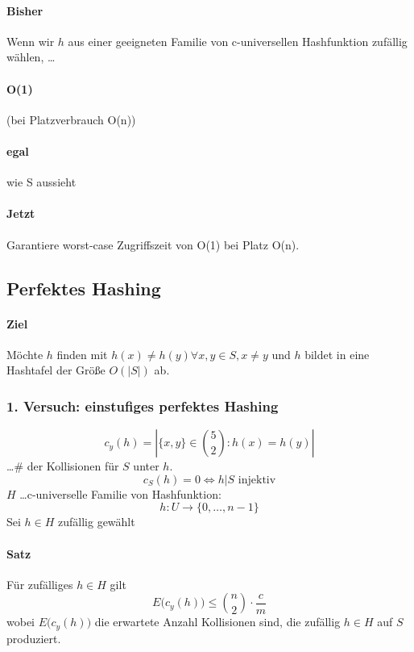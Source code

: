 \paragraph*{Bisher} Wenn wir $h$ aus einer geeigneten Familie von c-universellen Hashfunktion zufällig wählen, \dots %

\paragraph*{O(1)} (bei Platzverbrauch O(n))

\paragraph*{egal} wie S aussieht

\paragraph*{Jetzt} Garantiere worst-case Zugriffszeit von O(1) bei Platz O(n).


\subsection{Perfektes Hashing}
\paragraph*{Ziel} Möchte $h$ finden mit $h(x) \not= h(y) \forall x,y \in S, x \not= y$ und $h$ bildet in eine Hashtafel der Größe $O(|S|)$ ab.

\subsubsection{1. Versuch: einstufiges perfektes Hashing}
$$ c_y(h) = |\{ x,y \} \in {5 \choose 2} : h(x) = h(y)| $$ \dots \# der Kollisionen für $S$ unter $h$.
$$ c_S(h) = 0 \Leftrightarrow h|S \text{ injektiv} $$ $H$ \dots c-universelle Familie von Hashfunktion:
$$ h:U \rightarrow \{ 0,\dots,n-1 \} $$ Sei $h \in H$ zufällig gewählt

\paragraph*{Satz} Für zufälliges $h \in H$ gilt $$ E\big(c_y(h)\big) \leq {n \choose 2} \cdot \frac{c}{m} $$ wobei $E\big(c_y(h)\big)$ die erwartete Anzahl Kollisionen sind, die zufällig $h \in H$ auf $S$ produziert.

